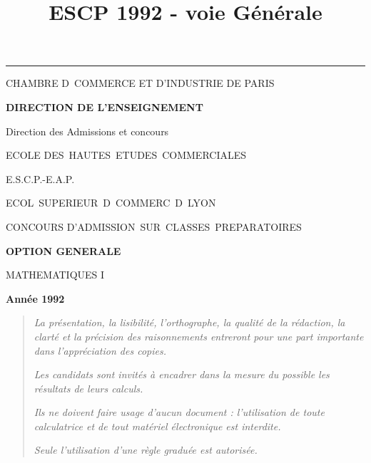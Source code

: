 \documentclass[11pt]{article}%
\title{\bf \vspace{-2cm} ESCP 1992 - voie Générale} %
\author{} %
\date{} %
\begin{document}
\maketitle %
\vspace{-1.4cm}\hrule %
\thispagestyle{fancy}

\vspace*{.2cm}




\begin{center}
{\small CHAMBRE D\E\ COMMERCE ET D'INDUSTRIE DE PARIS}

\textbf{DIRECTION DE L'ENSEIGNEMENT}

Direction des Admissions et concours

\underline{\hspace*{3cm}}

{\Large ECOLE DES\ HAUTES\ ETUDES\ COMMERCIALES}

{\Large E.S.C.P.-E.A.P.}

{\Large ECOL\E\ SUPERIEUR\E\ D\E\ COMMERC\E\ D\E\ LYON}{\large }

CONCOURS D'ADMISSION\ SUR\ CLASSES\ PREPARATOIRES

\underline{\hspace*{3cm}}

\textbf{OPTION GENERALE}

{\Large MATHEMATIQUES I}

\textbf{Année 1992}

\underline{\hspace*{3cm}}
\end{center}

\begin{quotation}
\noindent \textsl{La présentation, la lisibilité, l'orthographe, la
qualité
de la rédaction, la clarté et la précision des raisonnements entreront
pour
une part importante dans l'appréciation des copies.}

\noindent \textsl{Les candidats sont invités à encadrer dans la mesure
du
possible les résultats de leurs calculs.}

\noindent \textsl{Ils ne doivent faire usage d'aucun document :
l'utilisation de toute calculatrice et de tout matériel électronique
est
interdite.}

\noindent \textsl{Seule l'utilisation d'une règle graduée est
autorisée.}

\noindent \textsl{\hrulefill }
\end{quotation}
\end{document}
